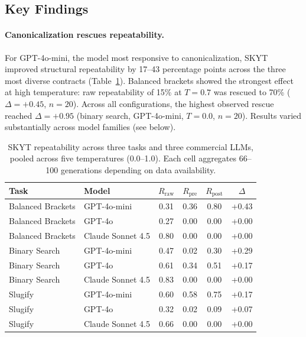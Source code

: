 \documentclass[sigconf]{acmart}
\begin{document}
\subsection{Key Findings}
\label{sec:findings}

\paragraph{Canonicalization rescues repeatability.}
For GPT-4o-mini, the model most responsive to canonicalization, SKYT improved structural repeatability by 17--43 percentage points across the three most diverse contracts (Table~\ref{tab:results}).  Balanced brackets showed the strongest effect at high temperature: raw repeatability of 15\% at $T{=}0.7$ was rescued to 70\% ($\Delta{=}{+}0.45$, $n{=}20$).  Across all configurations, the highest observed rescue reached $\Delta{=}{+}0.95$ (binary search, GPT-4o-mini, $T{=}0.0$, $n{=}20$).  Results varied substantially across model families (see below).

\begin{table}[t]
  \caption{SKYT repeatability across three tasks and three commercial LLMs, pooled across five temperatures (0.0--1.0). Each cell aggregates 66--100 generations depending on data availability.}
  \label{tab:results}
  \begin{tabular}{llcccc}
    \toprule
    Task & Model & $R_\text{raw}$ & $R_\text{pre}$ & $R_\text{post}$ & $\Delta$ \\
    \midrule
    Balanced Brackets & GPT-4o-mini       & 0.31 & 0.36 & 0.80 & +0.43 \\
    Balanced Brackets & GPT-4o            & 0.27 & 0.00 & 0.00 & +0.00 \\
    Balanced Brackets & Claude Sonnet 4.5 & 0.80 & 0.00 & 0.00 & +0.00 \\
    \midrule
    Binary Search     & GPT-4o-mini       & 0.47 & 0.02 & 0.30 & +0.29 \\
    Binary Search     & GPT-4o            & 0.61 & 0.34 & 0.51 & +0.17 \\
    Binary Search     & Claude Sonnet 4.5 & 0.83 & 0.00 & 0.00 & +0.00 \\
    \midrule
    Slugify           & GPT-4o-mini       & 0.60 & 0.58 & 0.75 & +0.17 \\
    Slugify           & GPT-4o            & 0.32 & 0.02 & 0.09 & +0.07 \\
    Slugify           & Claude Sonnet 4.5 & 0.66 & 0.00 & 0.00 & +0.00 \\
    \bottomrule
  \end{tabular}
\end{table}
\end{document}
